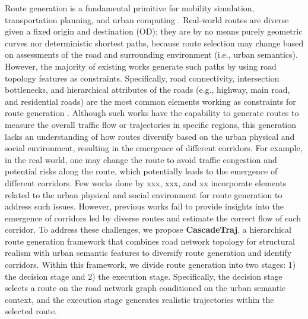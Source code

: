 Route generation is a fundamental primitive for mobility simulation, transportation planning, and urban computing \cite{}. Real-world routes are diverse given a fixed origin and destination (OD); they are by no means purely geometric curves nor deterministic shortest paths, because route selection may change based on assessments of the road and surrounding environment (i.e., urban semantics). However, the majority of existing works generate such paths by using road topology features as constraints. Specifically, road connectivity, intersection bottlenecks, and hierarchical attributes of the roads (e.g., highway, main road, and residential roads) are the most common elements working as constraints for route generation \cite{}. Although such works have the capability to generate routes to measure the overall traffic flow or trajectories in specific regions, this generation lacks an understanding of how routes diversify based on the urban physical and social environment, resulting in the emergence of different corridors. For example, in the real world, one may change the route to avoid traffic congestion and potential risks along the route, which potentially leads to the emergence of different corridors. Few works done by xxx, xxx, and xx incorporate elements related to the urban physical and social environment for route generation to address such issues. However, previous works fail to provide insights into the emergence of corridors led by diverse routes and estimate the correct flow of each corridor. To address these challenges, we propose \textbf{CascadeTraj}, a hierarchical route generation framework that combines road network topology for structural realism with urban semantic features to diversify route generation and identify corridors. Within this framework, we divide route generation into two stages: 1) the decision stage and 2) the execution stage. Specifically, the decision stage selects a route on the road network graph conditioned on the urban semantic context, and the execution stage generates realistic trajectories within the selected route.